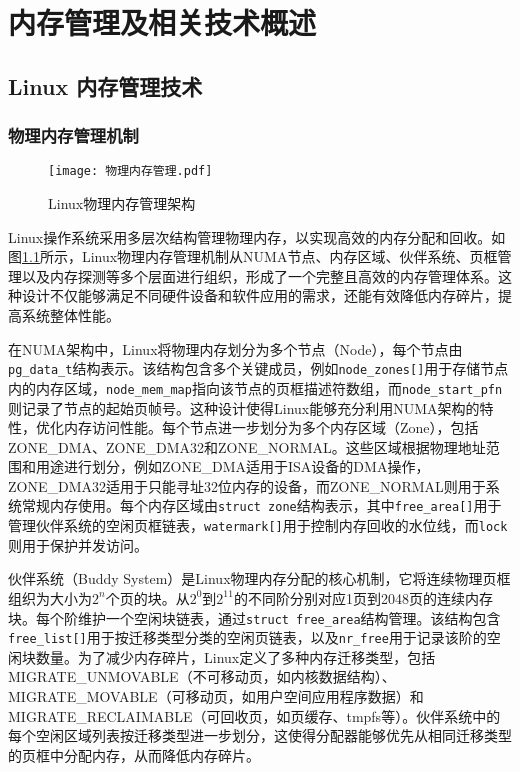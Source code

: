 \chapter{内存管理及相关技术概述}

\section{Linux 内存管理技术}

\subsection{物理内存管理机制}

\begin{figure}[h]
    \centering
    \texttt{[image: 物理内存管理.pdf]}
    \caption{Linux物理内存管理架构}
    \label{物理内存管理}
\end{figure}

Linux操作系统采用多层次结构管理物理内存，以实现高效的内存分配和回收。如图\ref{物理内存管理}所示，Linux物理内存管理机制从NUMA节点、内存区域、伙伴系统、页框管理以及内存探测等多个层面进行组织，形成了一个完整且高效的内存管理体系。这种设计不仅能够满足不同硬件设备和软件应用的需求，还能有效降低内存碎片，提高系统整体性能。

在NUMA架构中，Linux将物理内存划分为多个节点（Node），每个节点由\texttt{pg\_data\_t}结构表示。该结构包含多个关键成员，例如\texttt{node\_zones[]}用于存储节点内的内存区域，\texttt{node\_mem\_map}指向该节点的页框描述符数组，而\texttt{node\_start\_pfn}则记录了节点的起始页帧号。这种设计使得Linux能够充分利用NUMA架构的特性，优化内存访问性能。每个节点进一步划分为多个内存区域（Zone），包括ZONE\_DMA、ZONE\_DMA32和ZONE\_NORMAL。这些区域根据物理地址范围和用途进行划分，例如ZONE\_DMA适用于ISA设备的DMA操作，ZONE\_DMA32适用于只能寻址32位内存的设备，而ZONE\_NORMAL则用于系统常规内存使用。每个内存区域由\texttt{struct zone}结构表示，其中\texttt{free\_area[]}用于管理伙伴系统的空闲页框链表，\texttt{watermark[]}用于控制内存回收的水位线，而\texttt{lock}则用于保护并发访问。

伙伴系统（Buddy System）是Linux物理内存分配的核心机制，它将连续物理页框组织为大小为$2^n$个页的块。从$2^0$到$2^{11}$的不同阶分别对应1页到2048页的连续内存块。每个阶维护一个空闲块链表，通过\texttt{struct free\_area}结构管理。该结构包含\texttt{free\_list[]}用于按迁移类型分类的空闲页链表，以及\texttt{nr\_free}用于记录该阶的空闲块数量。为了减少内存碎片，Linux定义了多种内存迁移类型，包括MIGRATE\_UNMOVABLE（不可移动页，如内核数据结构）、MIGRATE\_MOVABLE（可移动页，如用户空间应用程序数据）和MIGRATE\_RECLAIMABLE（可回收页，如页缓存、tmpfs等）。伙伴系统中的每个空闲区域列表按迁移类型进一步划分，这使得分配器能够优先从相同迁移类型的页框中分配内存，从而降低内存碎片。

